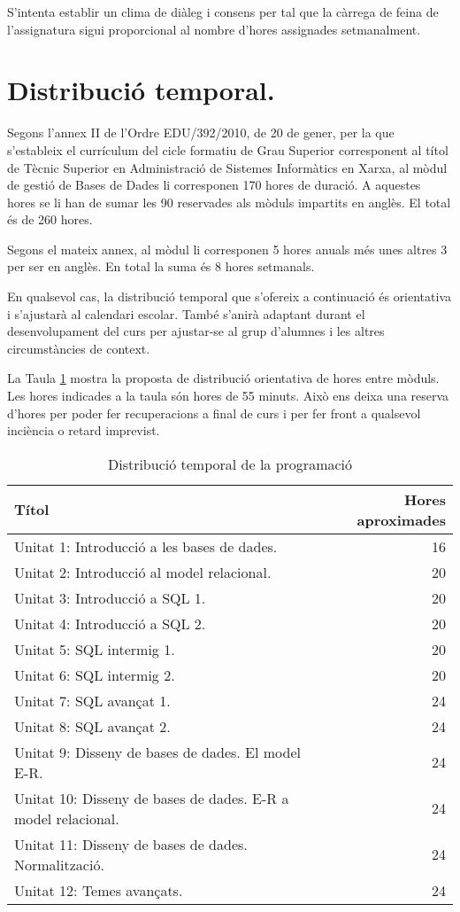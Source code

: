\documentclass[catalan, a4paper, 12pt, titlepage]{article}
\begin{document}
S'intenta establir un clima de diàleg i consens per tal que la càrrega de feina de l'assignatura sigui proporcional al nombre d'hores assignades setmanalment.


\section{Distribució temporal.}
\label{sec:distribució}

Segons l'annex II de l'Ordre EDU/392/2010, de 20 de gener, per la que s'estableix el currículum del cicle formatiu de Grau Superior corresponent al títol de Tècnic Superior en Administració de Sistemes Informàtics en Xarxa, al mòdul de gestió de Bases de Dades li corresponen 170 hores de duració. A aquestes hores se li han de sumar les 90 reservades als mòduls impartits en anglès. El total és de 260 hores.

Segons el mateix annex, al mòdul li corresponen 5 hores anuals més unes altres 3 per ser en anglès. En total la suma és 8 hores setmanals.

En qualsevol cas, la distribució temporal que s'ofereix a continuació és orientativa i s'ajustarà al calendari escolar. També s'anirà adaptant durant el desenvolupament del curs per ajustar-se al grup d'alumnes i les altres circumstàncies de context.

La Taula \ref{tab:distribuciotemporal} mostra la proposta de distribució orientativa de hores entre mòduls.
Les hores indicades a la taula són hores de 55 minuts.
Això ens deixa una reserva d'hores per poder fer recuperacions a final de curs i per fer front a qualsevol inciència o retard imprevist.

\begin{table}
	\centering
\begin{tabular}{lr}
 Títol & Hores aproximades\\
 \hline
 Unitat 1: Introducció a les bases de dades. & 16\\
 Unitat 2: Introducció al model relacional. & 20  \\
 Unitat 3: Introducció a SQL 1. & 20\\
 Unitat 4: Introducció a SQL 2. & 20 \\
 Unitat 5: SQL intermig 1. & 20 \\
 Unitat 6: SQL intermig 2. & 20 \\
 Unitat 7: SQL avançat 1. & 24 \\
 Unitat 8: SQL avançat 2. & 24\\
 Unitat 9: Disseny de bases de dades. El model E-R. & 24\\
 Unitat 10: Disseny de bases de dades. E-R a model relacional. & 24 \\
 Unitat 11: Disseny de bases de dades. Normalització.& 24 \\
 Unitat 12: Temes avançats. & 24 \\
\end{tabular}
	\caption{Distribució temporal de la programació} \label{tab:distribuciotemporal}
\end{table}
\end{document}
